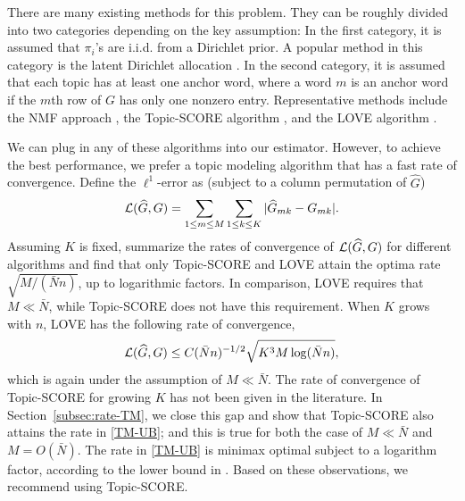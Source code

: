 \documentclass[preprint,11pt]{article}
\numberwithin{equation}{section}
\newcommand{\beq}{\begin{equation}}
\newcommand{\eeq}{\end{equation}}
\begin{document}
There are many existing methods for this problem. They can be roughly divided into two categories depending on the key assumption: In the first category, it is assumed that $\pi_i$'s are i.i.d. from a Dirichlet prior. 
A popular method in this category is the latent Dirichlet allocation \citep{blei2003latent}. 
In the second category, it is assumed that each topic has at least one anchor word, where a word $m$ is an anchor word if the $m$th row of $G$ has only one nonzero entry. 
Representative methods include the NMF approach \citep{arora2012learning}, the Topic-SCORE algorithm \citep{ke2024using}, and the LOVE algorithm \citep{bing2020fast}. 

We can plug in any of these algorithms into our estimator. However, to achieve the best performance, we prefer a topic modeling algorithm that has a fast rate of convergence. Define the $\ell^1$-error as   (subject to a column permutation of $\widehat{G}$)
$${\cal L}(\widehat{G}, G)=\sum_{1\leq m\leq M}\sum_{1\leq k\leq K}|\widehat{G}_{mk}-G_{mk}|.
$$
Assuming $K$ is fixed, \cite{ke2024entry} summarize the rates of convergence of ${\cal L}(\widehat{G}, G)$ for different algorithms and find that only Topic-SCORE \citep{ke2024using} and LOVE \citep{bing2020fast} attain the optima rate $\sqrt{M/(\bar{N}n)}$, up to logarithmic factors.  
In comparison, LOVE requires that $M\ll \bar{N}$, while Topic-SCORE does not have this requirement.  
When $K$ grows with $n$, LOVE has the following rate of convergence, 
\beq \label{TM-UB}
{\cal L}(\widehat{G}, G)\leq C(\bar{N}n)^{-1/2}\sqrt{K^{3}M\log(\bar{N}n)}, 
\eeq
which is again under the assumption of $M\ll \bar{N}$. The rate of convergence of Topic-SCORE for growing $K$ has not been given in the literature. In Section~\ref{subsec:rate-TM}, we close this gap and show that Topic-SCORE also attains the rate in \eqref{TM-UB}; and this is true for both the case of $M\ll \bar{N}$ and $M=O(\bar{N})$. The rate in \eqref{TM-UB} is minimax optimal subject to a logarithm factor, according to the lower bound in \cite{bing2020fast}. 
Based on these observations, we recommend using Topic-SCORE. 



\end{document}
